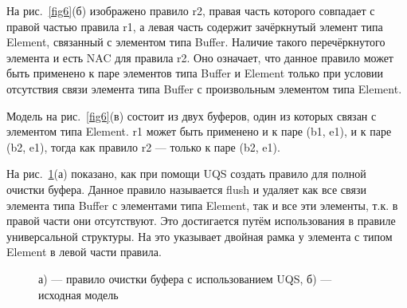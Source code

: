 \documentclass[a5paper]{article}
\begin{document}
На рис.~\ref{fig6}(б) изображено правило r2, правая часть которого совпадает с правой частью правила r1, а левая часть содержит зачёркнутый элемент типа Element, связанный с элементом типа Buffer. Наличие такого перечёркнутого элемента и есть NAC для правила r2. Оно означает, что данное правило может быть применено к паре элементов типа Buffer и Element только при условии отсутствия связи элемента типа Buffer с произвольным элементом типа Element.

Модель на рис.~\ref{fig6}(в) состоит из двух буферов, один из которых связан с элементом типа Element. r1 может быть применено и к паре (b1, e1), и к паре (b2, e1), тогда как правило r2 — только к паре (b2, e1).

На рис.~\ref{fig7}(а) показано, как при помощи UQS создать правило для полной очистки буфера. Данное правило называется flush и удаляет как все связи элемента типа Buffer с элементами типа Element, так и все эти элементы, т.к. в правой части они отсутствуют. Это достигается путём использования в правиле универсальной структуры. На это указывает двойная рамка у элемента с типом Element в левой части правила.

\begin{figure}[h]
\begin{center}
\begin{minipage}[h]{0.8\linewidth}
\end{minipage}
\begin{minipage}[h]{0.8\linewidth}
\end{minipage}
\end{center}
\caption{а) — правило очистки буфера с использованием UQS, б) — исходная модель}
\label{fig7}
\end{figure}
\end{document}
